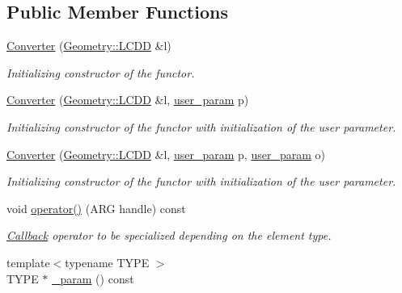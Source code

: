 \subsection*{Public Member Functions}
\begin{DoxyCompactItemize}
\item 
\hyperlink{struct_d_d4hep_1_1_converter_ab693f490d06d475fb15dc360ed45015f}{Converter} (\hyperlink{class_d_d4hep_1_1_geometry_1_1_l_c_d_d}{Geometry::LCDD} \&l)
\begin{DoxyCompactList}\small\item\em Initializing constructor of the functor. \item\end{DoxyCompactList}\item 
\hyperlink{struct_d_d4hep_1_1_converter_a46856eb07ef211b0e78d2ce8b336a213}{Converter} (\hyperlink{class_d_d4hep_1_1_geometry_1_1_l_c_d_d}{Geometry::LCDD} \&l, \hyperlink{struct_d_d4hep_1_1_converter_a13a876ea9cfcadf85a3dadd32e97a834}{user\_\-param} p)
\begin{DoxyCompactList}\small\item\em Initializing constructor of the functor with initialization of the user parameter. \item\end{DoxyCompactList}\item 
\hyperlink{struct_d_d4hep_1_1_converter_ac18342c9491be390a9329d2ae05b0bb6}{Converter} (\hyperlink{class_d_d4hep_1_1_geometry_1_1_l_c_d_d}{Geometry::LCDD} \&l, \hyperlink{struct_d_d4hep_1_1_converter_a13a876ea9cfcadf85a3dadd32e97a834}{user\_\-param} p, \hyperlink{struct_d_d4hep_1_1_converter_a13a876ea9cfcadf85a3dadd32e97a834}{user\_\-param} o)
\begin{DoxyCompactList}\small\item\em Initializing constructor of the functor with initialization of the user parameter. \item\end{DoxyCompactList}\item 
void \hyperlink{struct_d_d4hep_1_1_converter_a7584b9a6f22f1c29a26421c008bec963}{operator()} (ARG handle) const 
\begin{DoxyCompactList}\small\item\em \hyperlink{class_d_d4hep_1_1_callback}{Callback} operator to be specialized depending on the element type. \item\end{DoxyCompactList}\item 
{\footnotesize template$<$typename TYPE $>$ }\\TYPE $\ast$ \hyperlink{struct_d_d4hep_1_1_converter_af0cc676056c89bd966c084d88828a2b2}{\_\-param} () const 

\end{DoxyCompactItemize}
